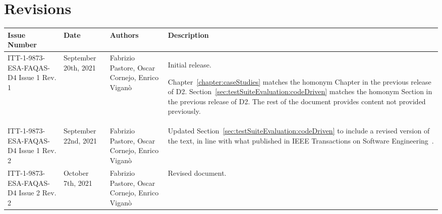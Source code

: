 
\section*{Revisions}
\label{sec:revisions}


\setlength\LTleft{0pt}
\setlength\LTright{0pt}
\tiny 
\begin{longtable}{|p{2cm}|p{1cm}|p{1.5cm}|p{9cm}|@{}}
\label{table:codeoperators} \\
\hline
\textbf{Issue Number}&\textbf{Date}&\textbf{Authors}&\textbf{Description}\\
\hline
ITT-1-9873-ESA-FAQAS-D4
Issue 1 Rev. 1&
September 20th, 2021&
Fabrizio Pastore, Oscar Cornejo, Enrico Viganò&
\begin{minipage}{8cm}
Initial release.

Chapter~\ref{chapter:caseStudies} matches the homonym Chapter in the previous release of D2.
Section~\ref{sec:testSuiteEvaluation:codeDriven} matches the homonym Section in the previous release of D2.
The rest of the document provides content not provided previously.
\end{minipage}
\\
\hline
ITT-1-9873-ESA-FAQAS-D4
Issue 1 Rev. 2&
September 22nd, 2021&
Fabrizio Pastore, Oscar Cornejo, Enrico Viganò&
\begin{minipage}{8cm}
Updated Section~\ref{sec:testSuiteEvaluation:codeDriven} to include a revised version of the text, in line with what published in IEEE Transactions on Software Engineering~\cite{Oscar:TSE}.
\end{minipage}
\\
\hline
ITT-1-9873-ESA-FAQAS-D4
Issue 2 Rev. 2&
October 7th, 2021&
Fabrizio Pastore, Oscar Cornejo, Enrico Viganò&
\begin{minipage}{8cm}
Revised document.
\end{minipage}
\\
\hline
                                                    
\end{longtable}
\normalsize

\clearpage